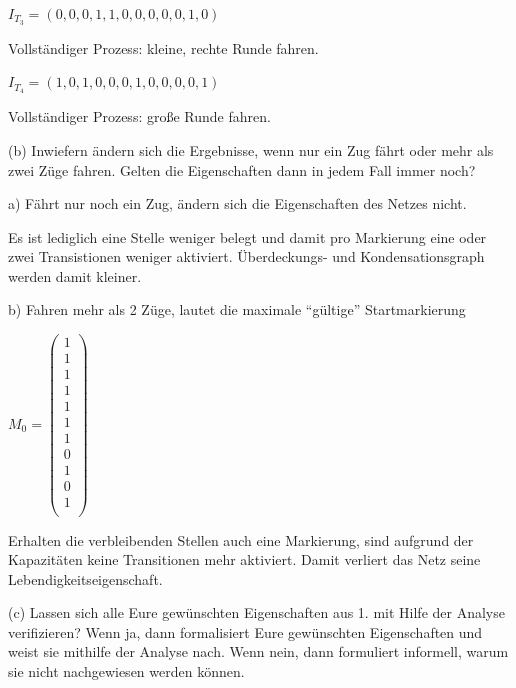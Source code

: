 \documentclass{scrreprt}
\begin{document}
\begin{enumerate}
$I_{T_3} = (0, 0, 0, 1, 1, 0, 0, 0, 0, 0, 1, 0)$

Vollständiger Prozess: kleine, rechte Runde fahren.

$I_{T_4} = (1, 0, 1, 0, 0, 0, 1, 0, 0, 0, 0, 1)$

Vollständiger Prozess: große Runde fahren.

(b) Inwiefern ändern sich die Ergebnisse, wenn nur ein Zug fährt oder mehr als zwei Züge fahren. Gelten die Eigenschaften dann in jedem Fall immer noch?

a) Fährt nur noch ein Zug, ändern sich die Eigenschaften des Netzes nicht. 

Es ist lediglich eine Stelle weniger belegt und damit pro Markierung eine oder zwei Transistionen weniger aktiviert. Überdeckungs- und Kondensationsgraph werden damit kleiner.


b) Fahren mehr als 2 Züge, lautet die maximale ``gültige'' Startmarkierung

\( M_0 = \begin{pmatrix}
1 \\ %
1 \\ %
1 \\ %
1 \\ %
1 \\ %
1 \\ %
1 \\ %
0 \\ %
1 \\ %
0 \\ %
1 \\ %
\end{pmatrix} \)

Erhalten die verbleibenden Stellen auch eine Markierung, sind aufgrund der Kapazitäten keine Transitionen mehr aktiviert. Damit verliert das Netz seine Lebendigkeitseigenschaft.


(c) Lassen sich alle Eure gewünschten Eigenschaften aus 1. mit Hilfe der Analyse verifizieren? Wenn ja, dann formalisiert Eure gewünschten Eigenschaften und weist sie mithilfe der Analyse nach. Wenn nein, dann formuliert informell, warum sie nicht nachgewiesen werden können.


\end{enumerate}
\end{document}
